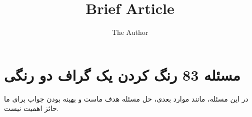 \documentclass{book} %
\title{Brief Article}
\author{The Author}
\begin{document}
\maketitle

\section{مسئله 83 رنگ کردن یک گراف دو رنگی}

در این مسئله، مانند موارد بعدی، حل مسئله هدف ماست و بهینه بودن جواب برای ما حائز اهمیت نیست.

\end{document}
